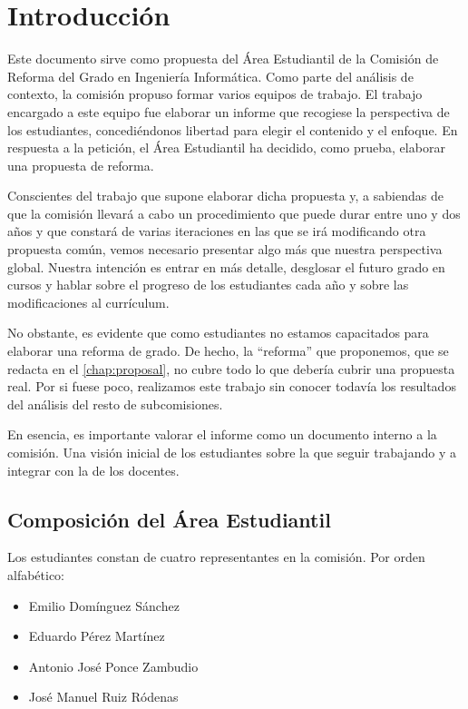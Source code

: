 \chapter{Introducción}

Este documento sirve como propuesta del Área Estudiantil de
la Comisión de Reforma del Grado en Ingeniería Informática.
Como parte del análisis de contexto,
la comisión propuso formar varios equipos de trabajo.
El trabajo encargado a este equipo fue elaborar un informe
que recogiese la perspectiva de los estudiantes,
concediéndonos libertad para elegir el contenido y el enfoque.
En respuesta a la petición,
el Área Estudiantil ha decidido, como prueba, elaborar una propuesta de reforma.

Conscientes del trabajo que supone elaborar dicha propuesta
y, a sabiendas de que la comisión llevará a cabo un procedimiento
que puede durar entre uno y dos años
y que constará de varias iteraciones en las que
se irá modificando otra propuesta común,
vemos necesario presentar algo más que nuestra perspectiva global.
Nuestra intención es entrar en más detalle,
desglosar el futuro grado en cursos y
hablar sobre el progreso de los estudiantes cada año y
sobre las modificaciones al currículum.

No obstante, es evidente que como estudiantes
no estamos capacitados para elaborar una reforma de grado.
De hecho, la ``reforma'' que proponemos,
que se redacta en el \cref{chap:proposal},
no cubre todo lo que debería cubrir una propuesta real.
Por si fuese poco, realizamos este trabajo sin conocer todavía
los resultados del análisis del resto de subcomisiones.

En esencia, es importante valorar el informe como
un documento interno a la comisión.
Una visión inicial de los estudiantes
sobre la que seguir trabajando y
a integrar con la de los docentes.

\section{Composición del Área Estudiantil}

Los estudiantes constan de cuatro representantes en la comisión.
Por orden alfabético:
\begin{itemize}
    \item Emilio Domínguez Sánchez
    \item Eduardo Pérez Martínez
    \item Antonio José Ponce Zambudio
    \item José Manuel Ruiz Ródenas
\end{itemize}

